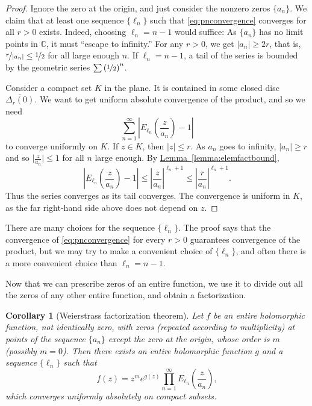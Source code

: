 \documentclass[12pt,openany]{book}
\newcommand{\sabs}[1]{\lvert {#1} \rvert}
\newcommand{\babs}[1]{\bigl\lvert {#1} \bigr\rvert}
\newcommand{\abs}[1]{\left\lvert {#1} \right\rvert}
\newcommand{\C}{{\mathbb{C}}}
\newcommand{\myquote}[1]{``#1''}
\theoremstyle{plain}
\newtheorem{cor}[thm]{Corollary}
\theoremstyle{remark}
\theoremstyle{definition}
\theoremstyle{exercise}
\theoremstyle{example}
\newcommand{\lemmaref}[1]{\hyperref[#1]{Lemma~\ref*{#1}}}
\begin{document}
\begin{proof}
Ignore the zero at the origin, and just consider the nonzero
zeros $\{ a_n \}$.  We claim that at least one sequence $\{ \ell_n \}$
such that \eqref{eq:pnconvergence} converges for all $r > 0$ exists.
Indeed, choosing $\ell_n = n-1$ would suffice:
As $\{ a_n \}$ has no limit points in $\C$, it must
\myquote{escape to infinity.}
For any $r > 0$, we get $\sabs{a_n} \geq 2r$, that is,
$\nicefrac{r}{\abs{a_n}} \leq \nicefrac{1}{2}$
for all large enough $n$.
If $\ell_n = n-1$, a tail of the series is bounded
by the geometric series $\sum {(\nicefrac{1}{2})}^n$.

Consider a compact set $K$ in the plane.  It is contained in some closed disc
$\overline{\Delta_r(0)}$.  We want to get uniform absolute convergence
of the product, and so we need
\begin{equation*}
\sum_{n=1}^\infty \abs{ E_{\ell_n}\left(\frac{z}{a_n}\right)-1}
\end{equation*}
to converge uniformly on $K$.
If $z \in K$, then $\sabs{z}\leq r$.  As $a_n$ goes to
infinity,
$\sabs{a_n} \geq r$
and so $\babs{\frac{z}{a_n}} \leq 1$
for all $n$ large enough.
By \lemmaref{lemma:elemfactbound},
\begin{equation*}
\abs{ E_{\ell_n}\left(\frac{z}{a_n}\right)-1}
\leq
\abs{\frac{z}{a_n}}^{\ell_n+1}
\leq
\abs{\frac{r}{a_n}}^{\ell_n+1} .
\end{equation*}
Thus the series converges as its tail converges.  The convergence
is uniform in $K$, as the far right-hand side above does not depend on $z$.
\end{proof}

There are many choices for the sequence $\{ \ell_n \}$.  The proof says
that the convergence of \eqref{eq:pnconvergence} 
for every $r>0$ guarantees convergence of the product, but we may try
to make a convenient choice of $\{ \ell_n \}$, and often
there is a more convenient choice than $\ell_n=n-1$.

Now that we can prescribe zeros of an entire function, we
use it to divide out all the zeros of any other entire function, and
obtain a factorization.

\begin{cor}[Weierstrass factorization theorem]
Let $f$ be an entire holomorphic function, not identically zero,
with zeros (repeated according to multiplicity) at points of
the sequence $\{ a_n \}$ except the zero at
the origin, whose order is $m$ (possibly $m=0$).  Then there exists an
entire holomorphic function $g$ and a sequence $\{ \ell_n \}$ such that
\begin{equation*}
f(z) = z^m e^{g(z)} \prod_{n=1}^\infty E_{\ell_n}\left(\frac{z}{a_n}\right) ,
\end{equation*}
which converges uniformly absolutely on compact subsets.
\end{cor}
\end{document}
